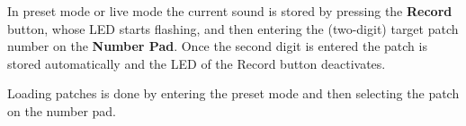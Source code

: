 In preset mode or live mode the current sound is stored by pressing the \textbf{Record} button, whose LED starts flashing, and then entering the (two-digit) target patch number on the \textbf{Number Pad}. Once the second digit is entered the patch is stored automatically and the LED of the Record button deactivates.   

Loading patches is done by entering the preset mode and then selecting the patch on the number pad.

